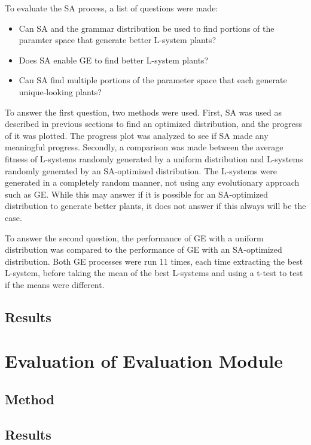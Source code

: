 To evaluate the SA process, a list of questions were made:
\begin{itemize}
	\item Can SA and the grammar distribution be used to find portions of the paramter space that generate better L-system plants?
	\item Does SA enable GE to find better L-system plants?
	\item Can SA find multiple portions of the parameter space that each generate unique-looking plants?
\end{itemize}
To answer the first question, two methods were used.
First, SA was used as described in previous sections to find an optimized distribution, and the progress of it was plotted.
The progress plot was analyzed to see if SA made any meaningful progress.
Secondly, a comparison was made between the average fitness of L-systems randomly generated by a uniform distribution and L-systems randomly generated by an SA-optimized distribution.
The L-systems were generated in a completely random manner, not using any evolutionary approach such as GE.
While this may answer if it is possible for an SA-optimized distribution to generate better plants, it does not answer if this always will be the case.

To answer the second question, the performance of GE with a uniform distribution was compared to the performance of GE with an SA-optimized distribution.
Both GE processes were run 11 times, each time extracting the best L-system, before taking the mean of the best L-systems and using a t-test to test if the means were different.

\subsection{Results}

\section{Evaluation of Evaluation Module}
\subsection{Method}
\subsection{Results}
